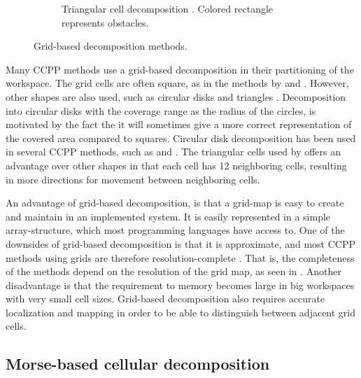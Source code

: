 \begin{figure}[h!]
{\begin{subfigure}[t]{0.5\textwidth}
		\caption{Triangular cell decomposition \citep{oh2004complete}. Colored rectangle represents obstacles.}
		\label{fig:grid_triangular}
	\end{subfigure}
	}
	
	\caption{Grid-based decomposition methods.}
	\label{fig:grid_shapes}
\end{figure}

Many CCPP methods use a grid-based decomposition in their partitioning of the workspace. The grid cells are often square, as in the methods by \citet{Viet2013} and \citet{yang2004neural}. However, other shapes are also used, such as circular disks \citep{guo2004coverage} and triangles \citep{oh2004complete}. Decomposition into circular disks with the coverage range as the radius of the circles, is motivated by the fact the it will sometimes give a more correct representation of the covered area compared to squares. Circular disk decomposition has been used in several CCPP methods, such as \citet{guo2006complete} and \citet{Scibilia2012}. The triangular cells used by \citet{oh2004complete} offers an advantage over other shapes in that each cell has 12 neighboring cells, resulting in more directions for movement between neighboring cells.

An advantage of grid-based decomposition, is that a grid-map is easy to create and maintain in an implemented system. It is easily represented in a simple array-structure, which most programming languages have access to. One of the downsides of grid-based decomposition is that it is approximate, and most CCPP methods using grids are therefore resolution-complete \citep{Galceran2013}. That is, the completeness of the methods depend on the resolution of the grid map, as seen in . Another disadvantage is that the requirement to memory becomes large in big workspaces with very small cell sizes. Grid-based decomposition also requires accurate localization and mapping in order to be able to distinguish between adjacent grid cells.


\subsection{Morse-based cellular decomposition}


